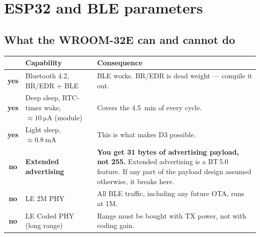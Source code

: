 \documentclass[11pt,a4paper]{article}
\newcommand{\yes}{\textcolor{ok}{\textbf{yes}}}
\newcommand{\no}{\textcolor{warn}{\textbf{no}}}
\begin{document}
\section{ESP32 and BLE parameters}
\label{sec:params}

\subsection{What the WROOM-32E can and cannot do}

\begin{center}
\begin{tabularx}{\textwidth}{clX}
\toprule
& \textbf{Capability} & \textbf{Consequence} \\
\midrule
\yes & Bluetooth 4.2, BR/EDR + BLE & BLE works. BR/EDR is dead weight --- compile it out. \\
\yes & Deep sleep, RTC-timer wake, $\approx\SI{10}{\micro\ampere}$ (module) & Covers the \SI{4.5}{\minute} of every cycle. \\
\yes & Light sleep, $\approx\SI{0.8}{\milli\ampere}$ & This is what makes D3 possible. \\
\midrule
\no  & \textbf{Extended advertising} & \textbf{You get 31 bytes of advertising payload, not 255.} Extended advertising is a BT\,5.0 feature. If any part of the payload design assumed otherwise, it breaks here. \\
\no  & LE 2M PHY & All BLE traffic, including any future OTA, runs at 1M. \\
\no  & LE Coded PHY (long range) & Range must be bought with TX power, not with coding gain. \\
\bottomrule
\end{tabularx}
\end{center}

\medskip
\noindent
{}
\end{document}
